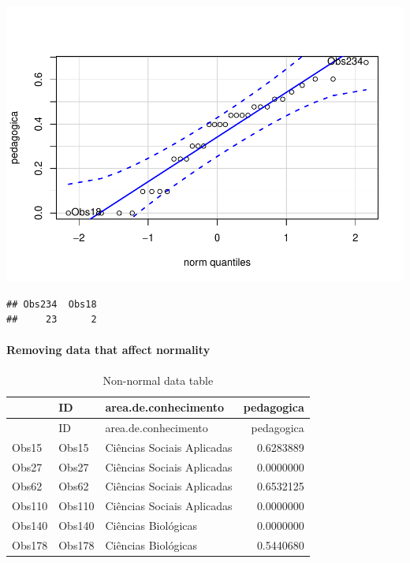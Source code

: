 \documentclass[]{article}
\newenvironment{Shaded}{\begin{snugshade}}{\end{snugshade}}
\newcommand{\CommentTok}[1]{\textcolor[rgb]{0.56,0.35,0.01}{\textit{#1}}}
\newcommand{\KeywordTok}[1]{\textcolor[rgb]{0.13,0.29,0.53}{\textbf{#1}}}
\newcommand{\NormalTok}[1]{#1}
\newcommand{\OperatorTok}[1]{\textcolor[rgb]{0.81,0.36,0.00}{\textbf{#1}}}
\newcommand{\StringTok}[1]{\textcolor[rgb]{0.31,0.60,0.02}{#1}}
\let\oldparagraph\paragraph
\renewcommand{\paragraph}[1]{\oldparagraph{#1}\mbox{}}
\begin{document}
\includegraphics{factorialAnova_files/figure-latex/unnamed-chunk-19-1.pdf}

\begin{verbatim}
## Obs234  Obs18 
##     23      2
\end{verbatim}

\hypertarget{removing-data-that-affect-normality}{%
\paragraph{Removing data that affect
normality}\label{removing-data-that-affect-normality}}

\begin{Shaded}
\end{Shaded}

\begin{longtable}[]{@{}lllr@{}}
\caption{Non-normal data table}\tabularnewline
\toprule
& ID & area.de.conhecimento & pedagogica\tabularnewline
\midrule
\endfirsthead
\toprule
& ID & area.de.conhecimento & pedagogica\tabularnewline
\midrule
\endhead
Obs15 & Obs15 & Ciências Sociais Aplicadas & 0.6283889\tabularnewline
Obs27 & Obs27 & Ciências Sociais Aplicadas & 0.0000000\tabularnewline
Obs62 & Obs62 & Ciências Sociais Aplicadas & 0.6532125\tabularnewline
Obs110 & Obs110 & Ciências Sociais Aplicadas & 0.0000000\tabularnewline
Obs140 & Obs140 & Ciências Biológicas & 0.0000000\tabularnewline
Obs178 & Obs178 & Ciências Biológicas & 0.5440680\tabularnewline
\bottomrule
\end{longtable}
\end{document}
